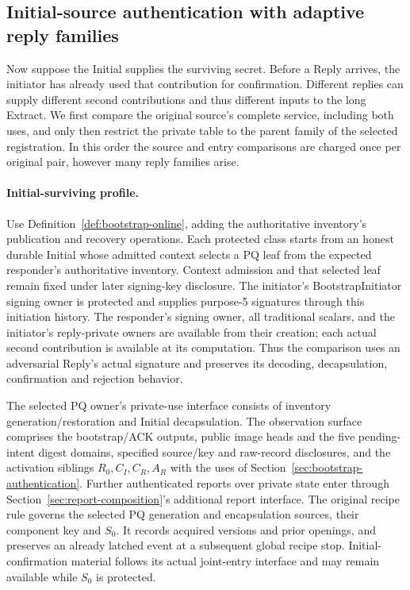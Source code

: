 \subsection{Initial-source authentication with adaptive reply families}
\label{sec:bootstrap-initial-source}

Now suppose the Initial supplies the surviving secret. Before a Reply
arrives, the initiator has already used that contribution for
confirmation. Different replies can supply different second
contributions and thus different inputs to the long Extract. We first
compare the original source's complete service, including both uses,
and only then restrict the private table to the parent family of the
selected registration. In this order the source and entry comparisons
are charged once per original pair, however many reply families arise.

\paragraph{Initial-surviving profile.}
Use Definition~\ref{def:bootstrap-online}, adding the authoritative
inventory's publication and recovery operations. Each protected class
starts from an honest durable Initial whose admitted context selects a
PQ leaf from the expected responder's authoritative inventory. Context
admission and that selected leaf remain fixed under later signing-key
disclosure. The initiator's BootstrapInitiator signing owner is protected
and supplies purpose-5 signatures through this initiation history. The
responder's signing owner, all traditional scalars, and the initiator's
reply-private owners are available from their creation; each actual
second contribution is available at its computation. Thus the comparison
uses an adversarial Reply's actual signature and preserves its decoding,
decapsulation, confirmation and rejection behavior.

The selected PQ owner's private-use interface consists of inventory
generation/restoration and Initial decapsulation. The observation surface
comprises the bootstrap/ACK outputs, public image heads and the five
pending-intent digest domains, specified source/key and raw-record
disclosures, and the activation siblings $R_0,C_I,C_R,A_R$ with the uses
of Section~\ref{sec:bootstrap-authentication}. Further authenticated
reports over private state enter through
Section~\ref{sec:report-composition}'s additional report interface.
The original recipe rule governs the selected PQ generation and
encapsulation sources, their component key and $S_0$. It records
acquired versions and prior openings, and preserves an already latched
event at a subsequent global recipe stop. Initial-confirmation material
follows its actual joint-entry interface and may remain available while
$S_0$ is protected.

